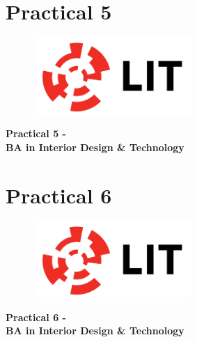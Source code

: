 \documentclass[a4paper, 10pt]{article}
\begin{document}
	


\newpage
\section{Practical 5}

\newpage
\setcounter{page}{1}
\begin{center}
	\begin{figure}[ht]
		\centering
		\includegraphics[width = 6cm]{img/LITlogo.jpg}
		\label{fig:logoa5}
	\end{figure}
	\Large\textbf{Practical 5 - }\\
	\large\textbf{BA in Interior Design \& Technology}
\end{center}		



\newpage
\section{Practical 6}

\newpage
\setcounter{page}{1}
\begin{center}
	\begin{figure}[ht]
		\centering
		\includegraphics[width = 6cm]{img/LITlogo.jpg}
		\label{fig:logoa6}
	\end{figure}
	\Large\textbf{Practical 6 - }\\
	\large\textbf{BA in Interior Design \& Technology}
\end{center}
\end{document}
